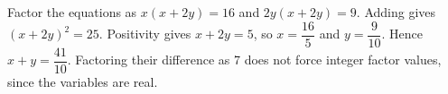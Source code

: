 Factor the equations as $ x(x+2y)=16 $ and $ 2y(x+2y)=9 $. Adding gives $(x+2y)^2=25 $. Positivity gives $ x+2y=5 $, so $ x=\dfrac{16}{5}$ and $ y=\dfrac{9}{10}$. Hence $\boxed{x+y=\dfrac{41}{10}}$. Factoring their difference as 7 does not force integer factor values, since the variables are real.
